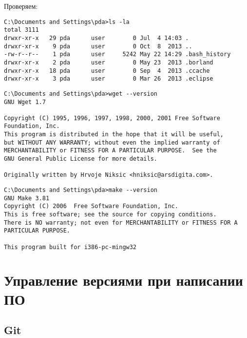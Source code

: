 \bigskip Проверяем:
\begin{lstlisting}[style=con]
C:\Documents and Settings\pda>ls -la
total 3111
drwxr-xr-x   29 pda      user        0 Jul  4 14:03 .
drwxr-xr-x    9 pda      user        0 Oct  8  2013 ..
-rw-r--r--    1 pda      user     5242 May 22 14:29 .bash_history
drwxr-xr-x    2 pda      user        0 May 23  2013 .borland
drwxr-xr-x   18 pda      user        0 Sep  4  2013 .ccache
drwxr-xr-x    3 pda      user        0 Mar 26  2013 .eclipse
\end{lstlisting}
\begin{lstlisting}[style=con]
C:\Documents and Settings\pda>wget --version
GNU Wget 1.7

Copyright (C) 1995, 1996, 1997, 1998, 2000, 2001 Free Software Foundation, Inc.
This program is distributed in the hope that it will be useful,
but WITHOUT ANY WARRANTY; without even the implied warranty of
MERCHANTABILITY or FITNESS FOR A PARTICULAR PURPOSE.  See the
GNU General Public License for more details.

Originally written by Hrvoje Niksic <hniksic@arsdigita.com>.
\end{lstlisting}
\begin{lstlisting}[style=con]
C:\Documents and Settings\pda>make --version
GNU Make 3.81
Copyright (C) 2006  Free Software Foundation, Inc.
This is free software; see the source for copying conditions.
There is NO warranty; not even for MERCHANTABILITY or FITNESS FOR A
PARTICULAR PURPOSE.

This program built for i386-pc-mingw32
\end{lstlisting}


\chapter{Управление версиями при написании ПО}

\section{Git}\label{git}\cite{progit}
